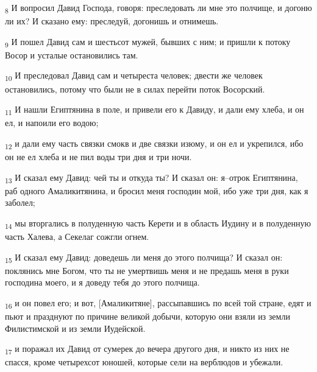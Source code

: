 \begin{tcolorbox}
\textsubscript{8} И вопросил Давид Господа, говоря: преследовать ли мне это полчище, и догоню ли их? И сказано ему: преследуй, догонишь и отнимешь.
\end{tcolorbox}
\begin{tcolorbox}
\textsubscript{9} И пошел Давид сам и шестьсот мужей, бывших с ним; и пришли к потоку Восор и усталые остановились там.
\end{tcolorbox}
\begin{tcolorbox}
\textsubscript{10} И преследовал Давид сам и четыреста человек; двести же человек остановились, потому что были не в силах перейти поток Восорский.
\end{tcolorbox}
\begin{tcolorbox}
\textsubscript{11} И нашли Египтянина в поле, и привели его к Давиду, и дали ему хлеба, и он ел, и напоили его водою;
\end{tcolorbox}
\begin{tcolorbox}
\textsubscript{12} и дали ему часть связки смокв и две связки изюму, и он ел и укрепился, ибо он не ел хлеба и не пил воды три дня и три ночи.
\end{tcolorbox}
\begin{tcolorbox}
\textsubscript{13} И сказал ему Давид: чей ты и откуда ты? И сказал он: я--отрок Египтянина, раб одного Амаликитянина, и бросил меня господин мой, ибо уже три дня, как я заболел;
\end{tcolorbox}
\begin{tcolorbox}
\textsubscript{14} мы вторгались в полуденную часть Керети и в область Иудину и в полуденную часть Халева, а Секелаг сожгли огнем.
\end{tcolorbox}
\begin{tcolorbox}
\textsubscript{15} И сказал ему Давид: доведешь ли меня до этого полчища? И сказал он: поклянись мне Богом, что ты не умертвишь меня и не предашь меня в руки господина моего, и я доведу тебя до этого полчища.
\end{tcolorbox}
\begin{tcolorbox}
\textsubscript{16} и он повел его; и вот, [Амаликитяне], рассыпавшись по всей той стране, едят и пьют и празднуют по причине великой добычи, которую они взяли из земли Филистимской и из земли Иудейской.
\end{tcolorbox}
\begin{tcolorbox}
\textsubscript{17} и поражал их Давид от сумерек до вечера другого дня, и никто из них не спасся, кроме четырехсот юношей, которые сели на верблюдов и убежали.
\end{tcolorbox}
